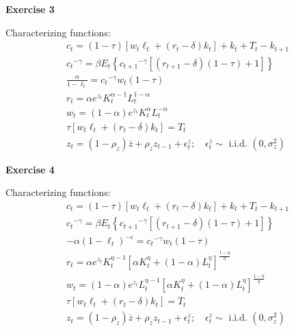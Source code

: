 \documentclass[12pt]{article}
\begin{document}
\textbf{Exercise 3} \par
    Characterizing functions:
    \begin{gather}
        c_{t}=(1-\tau)\left[w_{t} \ell_{t}+\left(r_{t}-\delta\right) k_{t}\right]+k_{t}+T_{t}-k_{t+1} \\
        {c_{t}}^{-\gamma}=\beta E_{t}\left\{{c_{t+1}}^{-\gamma}\left[\left(r_{t+1}-\delta\right)(1-\tau)+1\right]\right\} \\
        \frac{\alpha}{1-\ell_t}={c_{t}}^{-\gamma} w_{t}(1-\tau) \\
        r_{t}=\alpha e^{z_{t}} K_{t}^{\alpha - 1} L_{t}^{1-\alpha} \\
        w_{t}=(1-\alpha) e^{z_{t}} K_{t}^{\alpha} L_{t}^{-\alpha} \\
        \tau\left[w_{t} \ell_{t}+\left(r_{t}-\delta\right) k_{t}\right]=T_{t} \\
        z_{t}=\left(1-\rho_{z}\right) \overline{z}+\rho_{z} z_{t-1}+\epsilon_{t}^{z} ; \quad \epsilon_{t}^{z} \sim \text { i.i.d. }\left(0, \sigma_{z}^{2}\right)
    \end{gather}
    
\textbf{Exercise 4} \par
    Characterizing functions:
    \begin{gather}
        c_{t}=(1-\tau)\left[w_{t} \ell_{t}+\left(r_{t}-\delta\right) k_{t}\right]+k_{t}+T_{t}-k_{t+1} \\
        {c_{t}}^{-\gamma}=\beta E_{t}\left\{{c_{t+1}}^{-\gamma}\left[\left(r_{t+1}-\delta\right)(1-\tau)+1\right]\right\} \\
        -\alpha (1-\ell_t)^{-\epsilon}={c_{t}}^{-\gamma} w_{t}(1-\tau) \\
        r_{t}=\alpha e^{z_{t}} K_{t}^{\eta - 1} \left[\alpha K_{t}^{\eta}+(1-\alpha) L_{t}^{\eta}\right]^{\frac{1 - \eta}{\eta}} \\
        w_{t}=(1-\alpha) e^{z_{t}} L_{t}^{\eta - 1} \left[ \alpha K_{t}^{\eta}+(1-\alpha) L_{t}^{\eta}\right]^{\frac{1 - \eta}{\eta}} \\
        \tau\left[w_{t} \ell_{t}+\left(r_{t}-\delta\right) k_{t}\right]=T_{t} \\
        z_{t}=\left(1-\rho_{z}\right) \overline{z}+\rho_{z} z_{t-1}+\epsilon_{t}^{z} ; \quad \epsilon_{t}^{z} \sim \text { i.i.d. }\left(0, \sigma_{z}^{2}\right)
    \end{gather}
    
\end{document}

